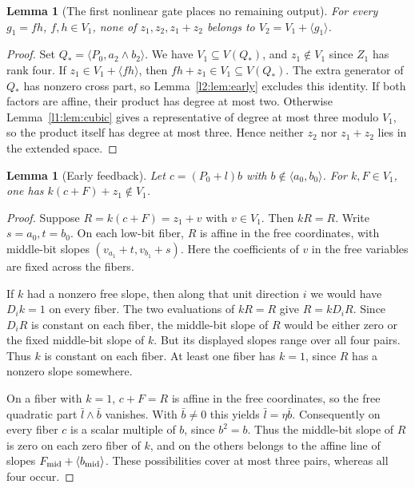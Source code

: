 \documentclass[11pt,a4paper]{article}
\theoremstyle{plain}
\newtheorem{lemma}[theorem]{Lemma}
\theoremstyle{remark}
\theoremstyle{plain}
\begin{document}
\begin{lemma}[The first nonlinear gate places no remaining output]\label{l1:lem:first}
For every $g_1=fh$, $f,h\in V_1$, none of $z_1,z_2,z_1+z_2$ belongs to $V_2=V_1+\langle g_1\rangle$.
\end{lemma}
\begin{proof}
Set $Q_*=\langle P_0,a_2\wedge b_2\rangle$.
We have $V_1\subseteq V(Q_*)$, and $z_1\notin V_1$
since $Z_1$ has rank four. If $z_1\in V_1+\langle fh\rangle$,
then $fh+z_1\in V_1\subseteq V(Q_*)$.
The extra generator of $Q_*$ has nonzero cross part, so
Lemma~\ref{l2:lem:early} excludes this identity.
If both factors are affine, their product has degree at most two.
Otherwise Lemma~\ref{l1:lem:cubic} gives a representative of degree
at most three modulo $V_1$, so the product itself has degree at most
three. Hence neither $z_2$ nor $z_1+z_2$ lies in the extended space.
\end{proof}

\begin{lemma}[Early feedback]\label{l1:lem:earlyfeedback}
Let $c=(P_0+l)b$ with $b\notin\langle a_0,b_0\rangle$. For $k,F\in V_1$, one has $k(c+F)+z_1\notin V_1$.
\end{lemma}
\begin{proof}
Suppose $R=k(c+F)=z_1+v$ with $v\in V_1$. Then $kR=R$. Write $s=a_0,t=b_0$. On each low-bit fiber, $R$ is affine in the free coordinates, with middle-bit slopes $(v_{a_1}+t,v_{b_1}+s)$. Here the coefficients of $v$ in the free variables are fixed across the fibers.

If $k$ had a nonzero free slope, then along that unit direction $i$ we would have $D_i k=1$ on every fiber. The two evaluations of $kR=R$ give $R=kD_iR$. Since $D_iR$ is constant on each fiber, the middle-bit slope of $R$ would be either zero or the fixed middle-bit slope of $k$. But its displayed slopes range over all four pairs. Thus $k$ is constant on each fiber. At least one fiber has $k=1$, since $R$ has a nonzero slope somewhere.

On a fiber with $k=1$, $c+F=R$ is affine in the free coordinates, so the free quadratic part $\bar l\wedge\bar b$ vanishes. With $\bar b\ne0$ this yields $\bar l=\eta\bar b$. Consequently on every fiber $c$ is a scalar multiple of $b$, since $b^2=b$. Thus the middle-bit slope of $R$ is zero on each zero fiber of $k$, and on the others belongs to the affine line of slopes $F_{\rm mid}+\langle b_{\rm mid}\rangle$. These possibilities cover at most three pairs, whereas all four occur.
\end{proof}
\end{document}
